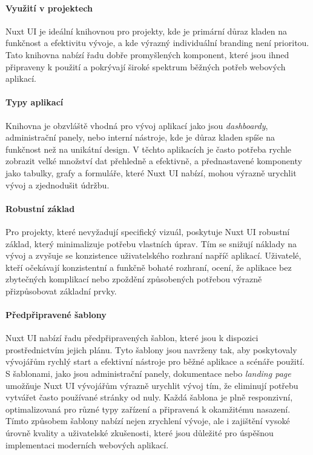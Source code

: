 \paragraph{Využití v projektech}
Nuxt UI je ideální knihovnou pro projekty, kde je primární důraz kladen na funkčnost a efektivitu vývoje, a kde výrazný individuální branding není prioritou. Tato knihovna nabízí řadu dobře promyšlených komponent, které jsou ihned připraveny k použití a pokrývají široké spektrum běžných potřeb webových aplikací.

\paragraph{Typy aplikací}
Knihovna je obzvláště vhodná pro vývoj aplikací jako jsou \emph{dashboardy}, administrační panely, nebo interní nástroje, kde je důraz kladen spíše na funkčnost než na unikátní design. V těchto aplikacích je často potřeba rychle zobrazit velké množství dat přehledně a efektivně, a přednastavené komponenty jako tabulky, grafy a formuláře, které Nuxt UI nabízí, mohou výrazně urychlit vývoj a zjednodušit údržbu.

\paragraph{Robustní základ}
Pro projekty, které nevyžadují specifický vizuál, poskytuje Nuxt UI robustní základ, který minimalizuje potřebu vlastních úprav. Tím se snižují náklady na vývoj a zvyšuje se konzistence uživatelského rozhraní napříč aplikací. Uživatelé, kteří očekávají konzistentní a funkčně bohaté rozhraní, ocení, že aplikace  bez zbytečných komplikací nebo zpoždění způsobených potřebou výrazně přizpůsobovat základní prvky.

\paragraph{Předpřipravené šablony}
Nuxt UI nabízí řadu předpřipravených šablon, které jsou k dispozici prostřednictvím jejich  plánu. Tyto šablony jsou navrženy tak, aby poskytovaly vývojářům rychlý start a efektivní nástroje pro běžné aplikace a scénáře použití. S šablonami, jako jsou administrační panely, dokumentace nebo \emph{landing page} umožňuje Nuxt UI vývojářům výrazně urychlit vývoj tím, že eliminují potřebu vytvářet často používané stránky od nuly. Každá šablona je plně responzivní, optimalizovaná pro různé typy zařízení a připravená k okamžitému nasazení. Tímto způsobem šablony nabízí nejen zrychlení vývoje, ale i zajištění vysoké úrovně kvality a uživatelské zkušenosti, které jsou důležité pro úspěšnou implementaci moderních webových aplikací. \cite{NuxtUITemplates}

